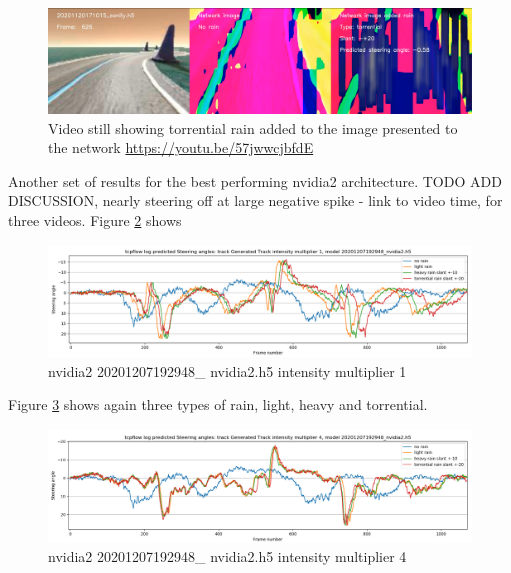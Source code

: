 \begin{figure}[ht]
 \centering 
 \includegraphics[width=\textwidth]{Figures/tcpflow_Run43.png}
 \caption{Video still showing torrential rain added to the image presented to the network \href{https://youtu.be/57jwwcjbfdE}{https://youtu.be/57jwwcjbfdE}}
 \label{fig:tcpflow_Run43} 
\end{figure}






Another set of results for the best performing nvidia2 architecture. TODO ADD DISCUSSION, nearly steering off at large negative spike - link to video time, for three videos.  
Figure \ref{fig:sa_GeneratedTrackintensitymultiplier1_20201207192948_nvidia2} shows
\begin{figure}[ht]
 \centering 
 \includegraphics[width=\textwidth]{Figures/sa_GeneratedTrackintensitymultiplier1_20201207192948_nvidia2.h5}
 \caption{nvidia2 20201207192948\_ nvidia2.h5 intensity multiplier 1}
 \label{fig:sa_GeneratedTrackintensitymultiplier1_20201207192948_nvidia2} 
\end{figure}

Figure \ref{fig:sa_GeneratedTrackintensitymultiplier4_20201207192948_nvidia2} shows again three types of rain, light, heavy and torrential.
\begin{figure}[ht]
 \centering 
 \includegraphics[width=\textwidth]{Figures/sa_GeneratedTrackintensitymultiplier4_20201207192948_nvidia2.h5}
 \caption{nvidia2 20201207192948\_ nvidia2.h5 intensity multiplier 4}
 \label{fig:sa_GeneratedTrackintensitymultiplier4_20201207192948_nvidia2} 
\end{figure}

